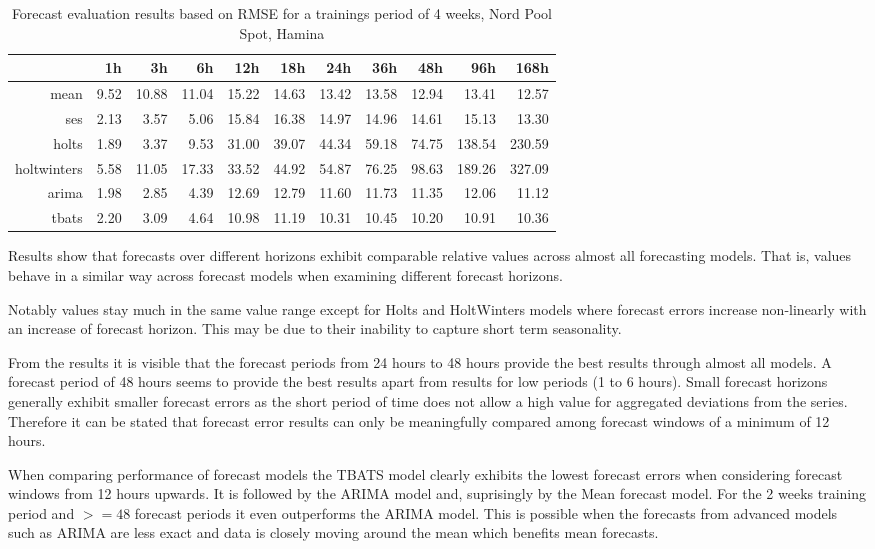 \begin{table}[ht]
\centering
\begin{tabular}{rrrrrrrrrrr}
  \hline
 & 1h & 3h & 6h & 12h & 18h & 24h & 36h & 48h & 96h & 168h \\ 
  \hline
mean & 9.52 & 10.88 & 11.04 & 15.22 & 14.63 & 13.42 & 13.58 & 12.94 & 13.41 & 12.57 \\ 
  ses & 2.13 & 3.57 & 5.06 & 15.84 & 16.38 & 14.97 & 14.96 & 14.61 & 15.13 & 13.30 \\ 
  holts & 1.89 & 3.37 & 9.53 & 31.00 & 39.07 & 44.34 & 59.18 & 74.75 & 138.54 & 230.59 \\ 
  holtwinters & 5.58 & 11.05 & 17.33 & 33.52 & 44.92 & 54.87 & 76.25 & 98.63 & 189.26 & 327.09 \\ 
  arima & 1.98 & 2.85 & 4.39 & 12.69 & 12.79 & 11.60 & 11.73 & 11.35 & 12.06 & 11.12 \\ 
  tbats & 2.20 & 3.09 & 4.64 & 10.98 & 11.19 & 10.31 & 10.45 & 10.20 & 10.91 & 10.36 \\ 
   \hline
\end{tabular}
\caption{Forecast evaluation results based on RMSE for a trainings period of 4 weeks, Nord Pool Spot, Hamina}
\label{tab:results_hamina_4weeks}
\end{table}


Results show that forecasts over different horizons exhibit comparable relative values across almost all forecasting models. That is, values behave in a similar way across forecast models when examining different forecast horizons. 

Notably values stay much in the same value range except for Holts and HoltWinters models where forecast errors increase non-linearly with an increase of forecast horizon. This may be due to their inability to capture short term seasonality. 

From the results it is visible that the forecast periods from 24 hours to 48 hours provide the best results through almost all models. A forecast period of 48 hours seems to provide the best results apart from results for low periods (1 to 6 hours). Small forecast horizons generally exhibit smaller forecast errors as the short period of time does not allow a high value for aggregated deviations from the series. Therefore it can be stated that forecast error results can only be meaningfully compared among forecast windows of a minimum of 12 hours. 

When comparing performance of forecast models the TBATS model clearly exhibits the lowest forecast errors when considering forecast windows from 12 hours upwards. It is followed by the ARIMA model and, suprisingly by the Mean forecast model. For the 2 weeks training period and $>= 48$ forecast periods it even outperforms the ARIMA model. This is possible when the forecasts from advanced models such as ARIMA are less exact and data is closely moving around the mean which benefits mean forecasts. 




